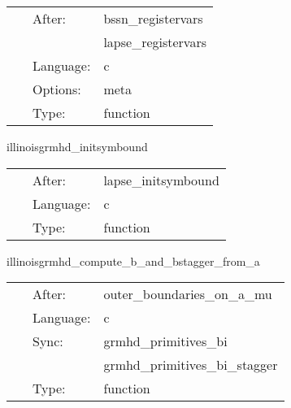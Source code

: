 \documentclass{article}
\begin{document}
\hspace{5mm}{\it register evolved, rhs variables in illinoisgrmhd for mol } 


\hspace{5mm}

 \begin{tabular*}{160mm}{cll} 
~ & After:  & bssn\_registervars \\ 
~& ~ &lapse\_registervars\\ 
~ & Language:  & c \\ 
~ & Options:  & meta \\ 
~ & Type:  & function \\ 
\end{tabular*} 


\vspace{5mm}


\hspace{5mm} illinoisgrmhd\_initsymbound 

\hspace{5mm}{\it schedule symmetries } 


\hspace{5mm}

 \begin{tabular*}{160mm}{cll} 
~ & After:  & lapse\_initsymbound \\ 
~ & Language:  & c \\ 
~ & Type:  & function \\ 
\end{tabular*} 


\vspace{5mm}


\hspace{5mm} illinoisgrmhd\_compute\_b\_and\_bstagger\_from\_a 

\hspace{5mm}{\it compute b and b\_stagger from a,  sync: grmhd\_primitives\_bi,grmhd\_primitives\_bi\_stagger } 


\hspace{5mm}

 \begin{tabular*}{160mm}{cll} 
~ & After:  & outer\_boundaries\_on\_a\_mu \\ 
~ & Language:  & c \\ 
~ & Sync:  & grmhd\_primitives\_bi \\ 
~& ~ &grmhd\_primitives\_bi\_stagger\\ 
~ & Type:  & function \\ 
\end{tabular*} 
\end{document}
